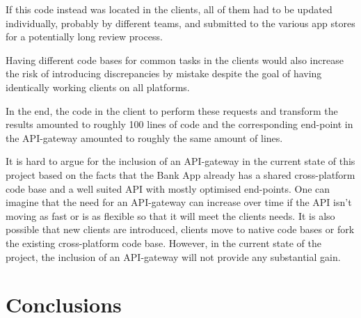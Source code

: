 \documentclass{cslthse-msc}
\begin{document}
If this code instead was located in the clients, all of them had to be updated individually, probably by different teams, and submitted to the various app stores for a potentially long review process.

Having different code bases for common tasks in the clients would also increase the risk of introducing discrepancies by mistake despite the goal of having identically working clients on all platforms.

In the end, the code in the client to perform these requests and transform the results amounted to roughly 100 lines of code and the corresponding end-point in the API-gateway amounted to roughly the same amount of lines.

It is hard to argue for the inclusion of an API-gateway in the current state of this project based on the facts that the Bank App already has a shared cross-platform code base and a well suited API with mostly optimised end-points. One can imagine that the need for an API-gateway can increase over time if the API isn't moving as fast or is as flexible so that it will meet the clients needs. It is also possible that new clients are introduced, clients move to native code bases or fork the existing cross-platform code base. However, in the current state of the project, the inclusion of an API-gateway will not provide any substantial gain.

\chapter{Conclusions}

\cleardoublepage
{}
{}


\end{document}
